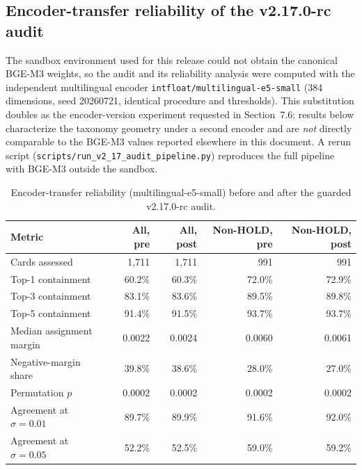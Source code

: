 \documentclass[11pt,a4paper]{article}
\newcommand{\code}[1]{\texttt{#1}}
\begin{document}
\subsection{Encoder-transfer reliability of the v2.17.0-rc audit}

The sandbox environment used for this release could not obtain the canonical
BGE-M3 weights, so the audit and its reliability analysis were computed with
the independent multilingual encoder \code{intfloat/multilingual-e5-small}
(384 dimensions, seed 20260721, identical procedure and thresholds). This
substitution doubles as the encoder-version experiment requested in
Section~7.6: results below characterize the taxonomy geometry under a second
encoder and are \emph{not} directly comparable to the BGE-M3 values reported
elsewhere in this document. A rerun script
(\code{scripts/run\_v2\_17\_audit\_pipeline.py}) reproduces the full pipeline
with BGE-M3 outside the sandbox.

\begin{table}[ht]
\centering
\caption{Encoder-transfer reliability (multilingual-e5-small) before and
after the guarded v2.17.0-rc audit.}
\label{tab:v217-encoder-transfer}
\begin{tabular}{lrrrr}
\toprule
Metric & All, pre & All, post & Non-HOLD, pre & Non-HOLD, post \\
\midrule
Cards assessed & 1,711 & 1,711 & 991 & 991 \\
Top-1 containment & 60.2\% & 60.3\% & 72.0\% & 72.9\% \\
Top-3 containment & 83.1\% & 83.6\% & 89.5\% & 89.8\% \\
Top-5 containment & 91.4\% & 91.5\% & 93.7\% & 93.7\% \\
Median assignment margin & 0.0022 & 0.0024 & 0.0060 & 0.0061 \\
Negative-margin share & 39.8\% & 38.6\% & 28.0\% & 27.0\% \\
Permutation $p$ & 0.0002 & 0.0002 & 0.0002 & 0.0002 \\
Agreement at $\sigma=0.01$ & 89.7\% & 89.9\% & 91.6\% & 92.0\% \\
Agreement at $\sigma=0.05$ & 52.2\% & 52.5\% & 59.0\% & 59.2\% \\
\bottomrule
\end{tabular}
\end{table}
\end{document}
